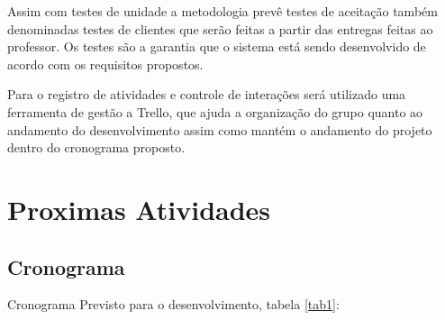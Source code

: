 \documentclass{automatextcc}
\begin{document}
Assim com testes de unidade a metodologia prevê testes de aceitação também denominadas testes de clientes que serão feitas a partir das entregas feitas ao professor. Os testes são a garantia que o sistema está sendo desenvolvido de acordo com os requisitos propostos.


Para o registro de atividades e controle de interações será utilizado uma ferramenta de gestão a Trello, que ajuda a organização do grupo quanto ao andamento do desenvolvimento assim como mantém o andamento do projeto dentro do cronograma proposto.


\chapter{Proximas Atividades}
\section{Cronograma}
Cronograma Previsto para o desenvolvimento, tabela \ref{tab1}:




\end{document}
